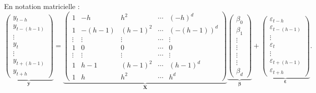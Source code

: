 \documentclass[
  12pt,
  a4paper,french]{article}
\newcommand\1{\mathds{1}}
\begin{document}
En notation matricielle :
\[
\underbrace{\begin{pmatrix}y_{t-h}\\
y_{t-(h-1)}\\
\vdots\\
y_{t}\\
\vdots\\
y_{t+(h-1)}\\
y_{t+h}
\end{pmatrix}}_{\boldsymbol y}=\underbrace{\begin{pmatrix}1 & -h & h^{2} & \cdots & (-h)^{d}\\
1 & -(h-1) & (h-1)^{2} & \cdots & (-(h-1))^{d}\\
\vdots & \vdots & \vdots & \cdots & \vdots\\
1 & 0 & 0 & \cdots & 0\\
\vdots & \vdots & \vdots & \cdots & \vdots\\
1 & h-1 & (h-1)^{2} & \cdots & (h-1)^{d}\\
1 & h & h^{2} & \cdots & h^{d}
\end{pmatrix}}_{\boldsymbol X}\underbrace{\begin{pmatrix}\beta_{0}\\
\beta_{1}\\
\vdots\\
\vdots\\
\vdots\\
\vdots\\
\beta_{d}
\end{pmatrix}}_{\boldsymbol \beta}+\underbrace{\begin{pmatrix}\varepsilon_{t-h}\\
\varepsilon_{t-(h-1)}\\
\vdots\\
\varepsilon_{t}\\
\vdots\\
\varepsilon_{t+(h-1)}\\
\varepsilon_{t+h}
\end{pmatrix}}_{\boldsymbol \varepsilon}.
\]
\end{document}
